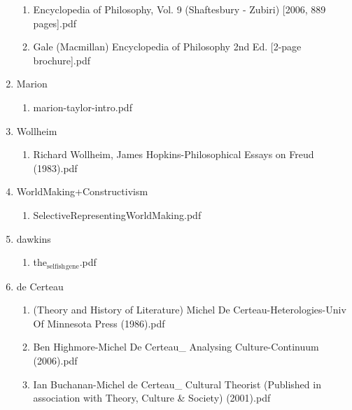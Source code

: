 \documentclass[11pt]{article}
\begin{document}
\begin{enumerate}
\begin{enumerate}
\item Encyclopedia of Philosophy, Vol. 9 (Shaftesbury - Zubiri) [2006, 889 pages].pdf
\label{sec-1-1-1-1-34-42-11}

\item Gale (Macmillan) Encyclopedia of Philosophy 2nd Ed. [2-page brochure].pdf
\label{sec-1-1-1-1-34-42-12}
\end{enumerate}

\item Marion
\label{sec-1-1-1-1-34-43}
\begin{enumerate}
\item marion-taylor-intro.pdf
\label{sec-1-1-1-1-34-43-1}
\end{enumerate}

\item Wollheim
\label{sec-1-1-1-1-34-44}
\begin{enumerate}
\item Richard Wollheim, James Hopkins-Philosophical Essays on Freud (1983).pdf
\label{sec-1-1-1-1-34-44-1}
\end{enumerate}

\item WorldMaking+Constructivism
\label{sec-1-1-1-1-34-45}
\begin{enumerate}
\item SelectiveRepresentingWorldMaking.pdf
\label{sec-1-1-1-1-34-45-1}
\end{enumerate}

\item dawkins
\label{sec-1-1-1-1-34-46}
\begin{enumerate}
\item the$_{\text{selfish}}$$_{\text{gene}}$.pdf
\label{sec-1-1-1-1-34-46-1}
\end{enumerate}

\item de Certeau
\label{sec-1-1-1-1-34-47}
\begin{enumerate}
\item (Theory and History of Literature) Michel De Certeau-Heterologies-Univ Of Minnesota Press (1986).pdf
\label{sec-1-1-1-1-34-47-1}

\item Ben Highmore-Michel De Certeau\_ Analysing Culture-Continuum (2006).pdf
\label{sec-1-1-1-1-34-47-2}

\item Ian Buchanan-Michel de Certeau\_ Cultural Theorist (Published in association with Theory, Culture \& Society) (2001).pdf
\label{sec-1-1-1-1-34-47-3}


\end{enumerate}
\end{enumerate}
\end{document}
